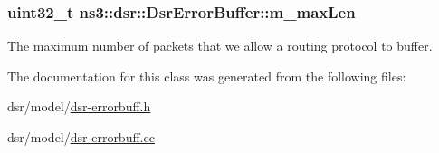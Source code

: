 \subsubsection[{\texorpdfstring{m\+\_\+max\+Len}{m_maxLen}}]{\setlength{\rightskip}{0pt plus 5cm}uint32\+\_\+t ns3\+::dsr\+::\+Dsr\+Error\+Buffer\+::m\+\_\+max\+Len\hspace{0.3cm}{\ttfamily [private]}}\hypertarget{classns3_1_1dsr_1_1DsrErrorBuffer_a1f9a6f0d47dfad68c8e51e318715d3d7}{}\label{classns3_1_1dsr_1_1DsrErrorBuffer_a1f9a6f0d47dfad68c8e51e318715d3d7}


The maximum number of packets that we allow a routing protocol to buffer. 



The documentation for this class was generated from the following files\+:\begin{DoxyCompactItemize}
\item 
dsr/model/\hyperlink{dsr-errorbuff_8h}{dsr-\/errorbuff.\+h}\item 
dsr/model/\hyperlink{dsr-errorbuff_8cc}{dsr-\/errorbuff.\+cc}\end{DoxyCompactItemize}
